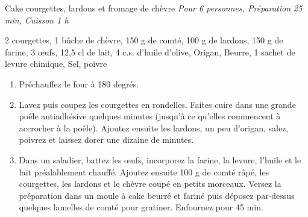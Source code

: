 \begin{recette}{Cake courgettes, lardons et fromage de chèvre}
  \emph{Pour 6 personnes, Préparation 25 min,	Cuisson 1 h}
  \begin{ingredients}
    2 courgettes\sep
    1 bûche de chèvre\sep
    150 g de comté\sep
    100 g de lardons\sep
    150 g de farine\sep
    3 œufs\sep
    12,5 cl de lait\sep 
    4 c.s. d’huile d’olive\sep
    Origan\sep
    Beurre\sep
    1 sachet de levure chimique\sep
    Sel, poivre
  \end{ingredients}
  
	\begin{enumerate}
	\item Préchauffez le four à 180 degrés.
  \item Lavez puis coupez les courgettes en rondelles. Faites cuire dans une grande poêle antiadhésive quelques minutes (jusqu’à ce qu’elles commencent à accrocher à la poêle). Ajoutez ensuite les lardons, un peu d’origan, salez, poivrez et laissez dorer une dizaine de minutes.
  \item Dans un saladier, battez les œufs, incorporez la farine, la levure, l’huile et le lait préalablement chauffé. Ajoutez ensuite 100 g de comté râpé, les courgettes, les lardons et le chèvre coupé en petits morceaux. Versez la préparation dans un moule à cake beurré et fariné puis déposez par-dessus quelques lamelles de comté pour gratiner. Enfournez pour 45 min.
  \end{enumerate}
\end{recette}
